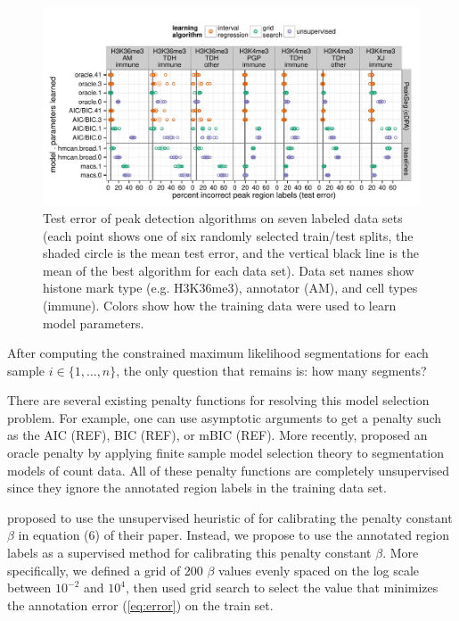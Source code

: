 \documentclass{article}
\begin{document}
\begin{figure}[b!]
  \centering
  \includegraphics[width=\textwidth]{figure-dp-peaks-regression-dots}
  \vskip -0.5cm
  \caption{Test error of peak detection algorithms on seven labeled
    data sets (each point shows one of six randomly selected
    train/test splits, the shaded circle is the mean test error, and
    the vertical black line is the mean of the best algorithm for each
    data set). Data set names show histone mark type (e.g. H3K36me3),
    annotator (AM), and cell types (immune). Colors show how the
    training data were used to learn model parameters.}
  \label{fig:test-error}
\end{figure}

After computing the constrained maximum likelihood segmentations for
each sample $i\in\{1,\dots, n\}$, the only question that remains is:
how many segments?

There are several existing penalty functions for resolving this model
selection problem. For example, one can use asymptotic arguments to
get a penalty such as the AIC (REF), BIC (REF), or mBIC (REF). More
recently, \citet{cleynen2013segmentation} proposed an oracle penalty
by applying finite sample model selection theory to segmentation
models of count data. All of these penalty functions are completely
unsupervised since they ignore the annotated region labels in the
training data set.

\citet{cleynen2013segmentation} proposed to use the 
un\-supervised heuristic of \citet{Lav05} for calibrating the penalty
constant $\beta$ in equation (6) of their paper. Instead, we propose to
use the annotated region labels as a super\-vised method for calibrating
this penalty constant $\beta$. More specifically, we defined a grid of
200 $\beta$ values evenly spaced on the log scale between $10^{-2}$
and $10^4$, then used grid search to select the value that minimizes
the annotation error (\ref{eq:error}) on the train set.
\end{document}
